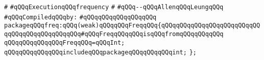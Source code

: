 \label{src/lib/compiler/back/low/library/freq.pkg}
\verb|#|\newline
\verb|#qQQqExecutionqQQqfrequency|\newline
\verb|#|\newline
\verb|#qQQq--qQQqAllenqQQqLeungqQQq|\newline
\newline
\verb|#qQQqCompiledqQQqby:|\newline
\verb|#qQQqqQQqqQQqqQQqqQQq|\newline
\newline
\newline
\verb|packageqQQqfreq:qQQq(weak)qQQqqQQqFreqqQQq{qQQqqQQqqQQqqQQqqQQqqQQqqQQqqQQqqQQqqQQqqQQqqQQq#qQQqFreqqQQqqQQqisqQQqfromqQQqqQQqqQQq|\newline
\newline
\verb|qQQqqQQqqQQqqQQqFreqqQQq=qQQqInt;|\newline
\newline
\verb|qQQqqQQqqQQqqQQqincludeqQQqpackageqQQqqQQqqQQqint;|\newline
\verb|};|\newline

